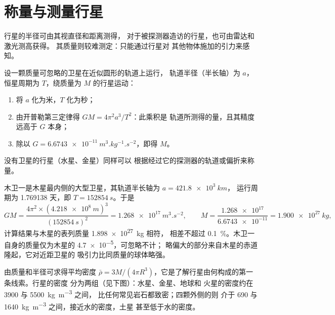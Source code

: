 \section{称量与测量行星}

行星的半径可由其视直径和距离测得，
对于被探测器造访的行星，也可由雷达和激光测高获得。
其质量则较难测定：只能通过行星对
其他物体施加的引力来感知。

\begin{method}[由卫星轨道求行星的质量]\label{met:b1:comparative-planetology:mass}
设一颗质量可忽略的卫星在近似圆形的轨道上运行，
轨道半径（半长轴）为 $a$，恒星周期为 $T$，绕质量为 $M$ 的行星运动：
\begin{enumerate}
  \item 将 $a$ 化为米，$T$ 化为秒；
  \item 由开普勒第三定律得 $GM = 4\pi^2a^3/T^2$：此乘积是
        轨道所测得的量，且其精度远高于 $G$ 本身；
  \item 除以 $G = \qty{6.6743e-11}{m^3.kg^{-1}.s^{-2}}$，即得 $M$。
\end{enumerate}
没有卫星的行星（水星、金星）同样可以
根据经过它的探测器的轨道或偏折来称量。
\end{method}

\begin{example}
木卫一是木星最内侧的大型卫星，其轨道半长轴为 $a = \qty{421.8e3}{km}$，
运行周期为 \num{1.769138} 天，即 $T = \qty{152854}{s}$。于是
\[
  GM = \frac{4\pi^2\times(\qty{4.218e8}{m})^3}{(\qty{152854}{s})^2}
  = \qty{1.268e17}{m^3.s^{-2}}, \qquad
  M = \frac{\num{1.268e17}}{\num{6.6743e-11}} = \qty{1.900e27}{kg},
\]
计算结果与木星的表列质量 \qty{1.898e27}{kg} 相符，
相差不超过 \qty{0.1}{\percent}。木卫一自身的质量仅为木星的 \num{4.7e-5}，可忽略不计；
略偏大的部分来自木星的赤道隆起，它对近距卫星的
吸引力比同质量的球体略强。
\end{example}

由质量和半径可求得平均密度 $\bar\rho =
3M/(4\pi R^3)$，它是了解行星由何构成的第一条线索。行星的密度
分为两组（见下图）：水星、金星、地球和
火星的密度约在 \num{3900} 与 \qty{5500}{kg.m^{-3}} 之间，
比任何常见岩石都致密；四颗外侧的则
介于 \num{690} 与 \qty{1640}{kg.m^{-3}} 之间，接近水的密度，土星
甚至低于水的密度。

